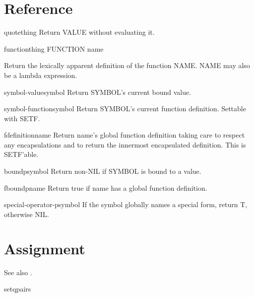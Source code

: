 \documentclass[10pt,english]{book}
\begin{document}
\section{Reference}
\label{sec:reference}

\begin{specialop}{quote}{thing}
Return VALUE without evaluating it.
\end{specialop}

\begin{specialop}{function}{thing}
  FUNCTION name

Return the lexically apparent definition of the function NAME. NAME may also
be a lambda expression.
\end{specialop}

\begin{accessor}{symbol-value}{symbol}
  Return SYMBOL's current bound value.
\end{accessor}

\begin{accessor}{symbol-function}{symbol}
  Return SYMBOL's current function definition. Settable with SETF.
\end{accessor}

\begin{accessor}{fdefinition}{name}
  Return name's global function definition taking care to respect any
   encapsulations and to return the innermost encapsulated definition.
   This is SETF'able.
\end{accessor}

\begin{function}{boundp}{symbol}
  Return non-NIL if SYMBOL is bound to a value.
\end{function}

\begin{function}{fboundp}{name}
  Return true if name has a global function definition.
\end{function}

\begin{function}{special-operator-p}{symbol}
  If the symbol globally names a special form, return T, otherwise NIL.
\end{function}

\section{Assignment}
\label{sec:assignment}

See also .

\begin{specialop}{setq}{\rest pairs}
\end{specialop}
\end{document}
